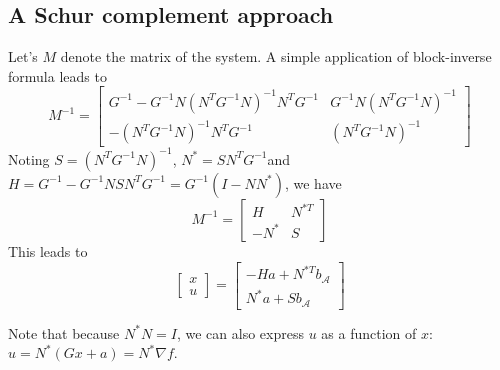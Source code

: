 \documentclass[11pt,a4paper]{article}
\newcommand{\BIN}{\begin{bmatrix}}
\newcommand{\BOUT}{\end{bmatrix}}
\newcommand{\act}{\mathcal{A}}
\begin{document}
\subsection{A Schur complement approach}
Let's $M$ denote the matrix of the system. A simple application of block-inverse formula leads to
\begin{equation}
M^{-1} = \BIN G^{-1} - G^{-1} N (N^T G^{-1} N)^{-1} N^T G^{-1} & G^{-1} N (N^T G^{-1} N)^{-1} \\ - (N^T G^{-1} N)^{-1} N^T G^{-1} & (N^T G^{-1} N)^{-1} \BOUT
\end{equation}
Noting $S = (N^T G^{-1} N)^{-1}$, $N^* = S N^T G^{-1}$\newline and $H = G^{-1} - G^{-1} N S N^T G^{-1} = G^{-1}(I-N N^*)$, we have
\begin{equation}
M^{-1} = \BIN H & N^{*T} \\ - N^* & S \BOUT
\end{equation}
This leads to
\begin{equation}
	\BIN x \\ u \BOUT = \BIN -H a + N^{*T} b_\act \\ N^* a + S b_\act\BOUT \label{eq:primalDualSol}
\end{equation}

Note that because $N^* N = I$, we can also express $u$ as a function of $x$: $u = N^* (Gx+a) = N^* \nabla f$.
\end{document}
